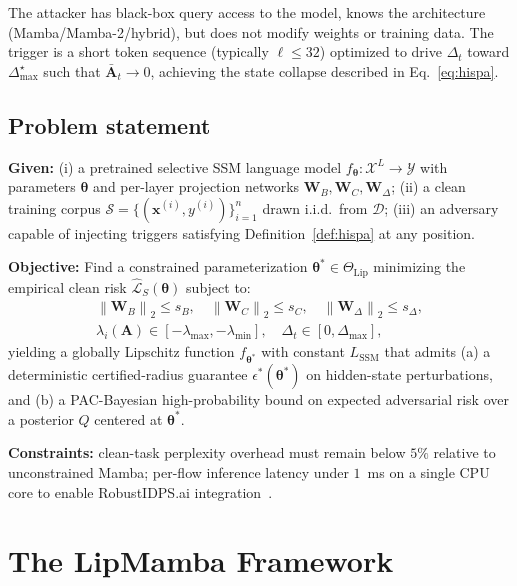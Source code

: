 \documentclass[12pt,a4paper]{article}
\theoremstyle{definition}
\theoremstyle{remark}
\newcommand{\modelname}{LipMamba}
\newcommand{\Lcal}{\mathcal{L}}
\newcommand{\Dcal}{\mathcal{D}}
\newcommand{\Xcal}{\mathcal{X}}
\newcommand{\Ycal}{\mathcal{Y}}
\newcommand{\Scal}{\mathcal{S}}
\newcommand{\norm}[1]{\left\|#1\right\|}
\begin{document}
The attacker has black-box query access to the model, knows the architecture (Mamba/Mamba-2/hybrid), but does not modify weights or training data. The trigger is a short token sequence (typically $\ell \leq 32$) optimized to drive $\Delta_t$ toward $\Delta_{\max}^\star$ such that $\bar{\mathbf{A}}_t \to 0$, achieving the state collapse described in Eq.~\eqref{eq:hispa}.

\subsection{Problem statement}

\noindent\textbf{Given:} (i) a pretrained selective SSM language model $f_{\bm{\theta}}: \Xcal^L \to \Ycal$ with parameters $\bm{\theta}$ and per-layer projection networks $\mathbf{W}_B, \mathbf{W}_C, \mathbf{W}_\Delta$; (ii) a clean training corpus $\Scal = \{(\mathbf{x}^{(i)}, y^{(i)})\}_{i=1}^n$ drawn i.i.d.\ from $\Dcal$; (iii) an adversary capable of injecting triggers satisfying Definition~\ref{def:hispa} at any position.

\noindent\textbf{Objective:} Find a constrained parameterization $\bm{\theta}^* \in \Theta_{\mathrm{Lip}}$ minimizing the empirical clean risk $\hat{\Lcal}_S(\bm{\theta})$ subject to:
\begin{align}
    \norm{\mathbf{W}_B}_2 \leq s_B,\quad
    \norm{\mathbf{W}_C}_2 \leq s_C,\quad
    \norm{\mathbf{W}_\Delta}_2 \leq s_\Delta, \label{eq:spec}\\
    \lambda_i(\mathbf{A}) \in [-\lambda_{\max}, -\lambda_{\min}],\quad
    \Delta_t \in [0, \Delta_{\max}], \label{eq:eig}
\end{align}
yielding a globally Lipschitz function $f_{\bm{\theta}^*}$ with constant $L_{\mathrm{SSM}}$ that admits (a) a deterministic certified-radius guarantee $\epsilon^*(\bm{\theta}^*)$ on hidden-state perturbations, and (b) a PAC-Bayesian high-probability bound on expected adversarial risk over a posterior $Q$ centered at $\bm{\theta}^*$.

\noindent\textbf{Constraints:} clean-task perplexity overhead must remain below $5\%$ relative to unconstrained Mamba; per-flow inference latency under $1$~ms on a single CPU core to enable RobustIDPS.ai integration~\cite{anaedevha2026robustidps}.


\section{The \modelname{} Framework}
\label{sec:framework}
\end{document}
